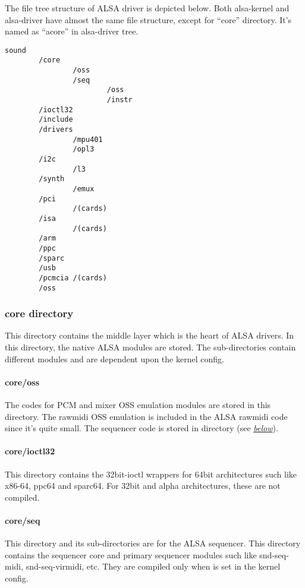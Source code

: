 \documentclass[a4paper,8pt,english]{sphinxmanual}
\begin{document}
The file tree structure of ALSA driver is depicted below. Both
alsa-kernel and alsa-driver have almost the same file structure, except
for “core” directory. It's named as “acore” in alsa-driver tree.

\begin{Verbatim}[commandchars=\\\{\}]
sound
        /core
                /oss
                /seq
                        /oss
                        /instr
        /ioctl32
        /include
        /drivers
                /mpu401
                /opl3
        /i2c
                /l3
        /synth
                /emux
        /pci
                /(cards)
        /isa
                /(cards)
        /arm
        /ppc
        /sparc
        /usb
        /pcmcia /(cards)
        /oss
\end{Verbatim}


\subsubsection{core directory}
\label{sound/kernel-api/writing-an-alsa-driver:core-directory}
This directory contains the middle layer which is the heart of ALSA
drivers. In this directory, the native ALSA modules are stored. The
sub-directories contain different modules and are dependent upon the
kernel config.


\paragraph{core/oss}
\label{sound/kernel-api/writing-an-alsa-driver:core-oss}
The codes for PCM and mixer OSS emulation modules are stored in this
directory. The rawmidi OSS emulation is included in the ALSA rawmidi
code since it's quite small. The sequencer code is stored in
 directory (see {\hyperref[sound/kernel\string-api/writing\string-an\string-alsa\string-driver:core\string-seq\string-oss]{\emph{below}}}).


\paragraph{core/ioctl32}
\label{sound/kernel-api/writing-an-alsa-driver:core-ioctl32}
This directory contains the 32bit-ioctl wrappers for 64bit architectures
such like x86-64, ppc64 and sparc64. For 32bit and alpha architectures,
these are not compiled.


\paragraph{core/seq}
\label{sound/kernel-api/writing-an-alsa-driver:core-seq}
This directory and its sub-directories are for the ALSA sequencer. This
directory contains the sequencer core and primary sequencer modules such
like snd-seq-midi, snd-seq-virmidi, etc. They are compiled only when
 is set in the kernel config.
\end{document}
